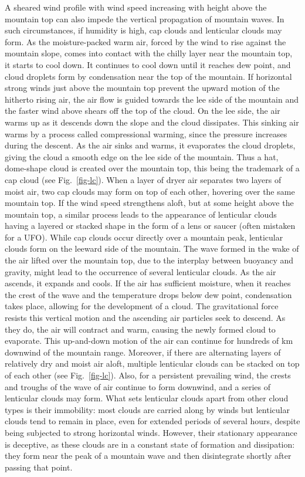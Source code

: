 \documentclass[11pt,twoside,reqno,centertags]{amsart}
\theoremstyle{definition}
\begin{document}
A sheared wind profile with wind speed increasing with height above the mountain top can also impede the vertical propagation of mountain waves. In such circumstances, if humidity is high, cap clouds and lenticular clouds may form. 
As the moisture-packed warm air, forced by the wind to rise against the mountain slope, comes into contact with the chilly layer near the mountain top, it starts to cool down. It continues to cool down until it reaches dew point,
and cloud droplets form by condensation near the top of the mountain. If horizontal strong winds just above the mountain top prevent the upward motion of the hitherto rising air, the air flow is guided towards the lee side of the mountain 
and the faster wind above shears off the top of the cloud. On the lee side, the air warms up as it descends down the slope and the cloud dissipates. This sinking air warms by a process called compressional warming, 
since the pressure increases during the descent. As the air sinks and warms, it evaporates the cloud droplets, giving the cloud a smooth edge on the lee side of the mountain. Thus a hat, dome-shape cloud is created 
over the mountain top, this being the trademark of a cap cloud (see Fig.~\ref{fig-lc}). When a layer of dryer air separates two layers of moist air, two cap clouds may form on top of each other, hovering over the same
mountain top. If the wind speed strengthens aloft, but at some height above the mountain top, a similar process leads to the appearance of lenticular clouds having a layered
or stacked shape in the form of a lens or saucer (often mistaken for a UFO). While cap clouds occur directly over a mountain peak, lenticular clouds form on the leeward side of the mountain. 
The wave formed in the wake of the air lifted over the mountain top, due to the interplay between buoyancy and gravity, might lead to the occurrence of several lenticular clouds. 
As the air ascends, it expands and cools. If the air has sufficient moisture, when it reaches the crest of the wave and the temperature drops below dew point, condensation takes
place, allowing for the development of a cloud. The gravitational force resists this vertical motion and the ascending air particles seek to descend. As they do, the air will contract and warm, causing the newly formed cloud to evaporate. 
This up-and-down motion of the air can continue for hundreds of km downwind of the mountain range. Moreover, if there are alternating layers of relatively dry and moist
air aloft, multiple lenticular clouds can be stacked on top of each other (see Fig.~\ref{fig-lc}). Also, for a persistent prevailing wind, the crests and
troughs of the wave of air continue to form downwind, and a series of lenticular clouds may form. What sets lenticular clouds apart from other cloud types is their immobility: most clouds are carried along by winds but lenticular clouds tend to remain in place, 
even for extended periods of several hours, despite being subjected to strong horizontal winds. However, their stationary appearance is deceptive, as these clouds are in a constant state of formation and dissipation: 
they form near the peak of a mountain wave and then disintegrate shortly after passing that point. 
\end{document}
